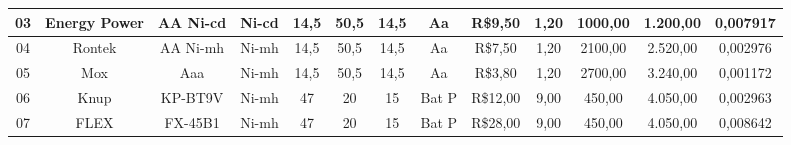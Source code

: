 \begin{table}[htp]
\begin{tabular}{|c|c|c|c|c|c|c|c|c|c|c|c|c|}
03                                               & Energy Power                                & AA Ni-cd                                     & Ni-cd                                                & 14,5       & 50,5      & 14,5      & Aa                                                      & R\$9,50                                     & 1,20                                                     & 1000,00                                   & 1.200,00                                 & 0,007917                                       \\[2pt] \hline
04                                               & Rontek                                      & AA Ni-mh                                     & Ni-mh                                                & 14,5       & 50,5      & 14,5      & Aa                                                      & R\$7,50                                     & 1,20                                                     & 2100,00                                   & 2.520,00                                 & 0,002976                                       \\[2pt] \hline
05                                               & Mox                                         & Aaa                                          & Ni-mh                                                & 14,5       & 50,5      & 14,5      & Aa                                                      & R\$3,80                                     & 1,20                                                     & 2700,00                                   & 3.240,00                                 & 0,001172                                       \\[2pt] \hline
06                                               & Knup                                        & KP-BT9V                                      & Ni-mh                                                & 47         & 20        & 15        & Bat P                                                   & R\$12,00                                    & 9,00                                                     & 450,00                                    & 4.050,00                                 & 0,002963                                       \\[2pt] \hline
07                                               & FLEX                                        & FX-45B1                                      & Ni-mh                                                & 47         & 20        & 15        & Bat P                                                   & R\$28,00                                    & 9,00                                                     & 450,00                                    & 4.050,00                                 & 0,008642                                       \\[2pt] \hline

\end{tabular}
\end{table}
